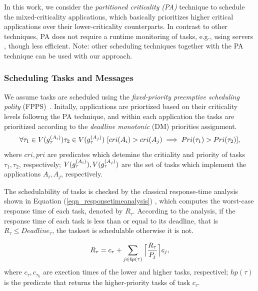 In this work, we consider the \textit{partitioned criticality (PA)}  technique to schedule the mixed-criticality applications, which basically prioritizes higher critical applications over their lower-criticality counterparts. In contrast to other techniques, PA does not require a runtime monitoring of tasks, e.g., using servers \cite{AbeniIntegratingSystems,Ashjaei2017DesigningSystems,Inam2014ThePlatforms}, though less efficient. Note: other scheduling techniques together with the PA technique can be used with our approach.

\subsubsection{Scheduling Tasks and Messages}\label{subsec_responsetimeanalysis}
We assume tasks are scheduled using the \textit{fixed-priority preemptive scheduling polity} (FPPS)~\cite{Sha-RTS-2004}. Initally, applications are priortized based on their criticality levels followng the PA technique, and within each application the tasks are prioritized according to the \textit{deadline monotonic} (DM) priorities assignment. 
\[
\forall \tau_1\in V(\sss{g}[i][\tau])\tau_2\in V(\sss{g}[j][\tau])\ [cri(A_i)>cri(A_j)\implies Pri(\tau_1)>Pri(\tau_2)],
\]
where $cri, pri$ are predicates which detemine the critiality and priority of tasks $\tau_1,\tau_2$, respectively; $V(\sss{g}[i][\tau]), V(\sss{g}[j][\tau])$ are the set of tasks which implement the applications $A_i,A_j$, respectively.

The schedulability of tasks is checked by the classical response-time analysis shown in Equation (\ref{eqn_responsetimeanalysis}) \cite{Baruah2011Response-timeSystems,Baruah2011Response-timeSystems}, which computes the worst-case response time of each task, denoted by $R_\tau$. According to the analysis, if the response time of each task is less than or equal to its deadline, that is $R_\tau\leq Deadline_\tau$, the taskset is schedulable otherwise it is not. 

\begin{align}
\label{eqn_responsetimeanalysis}
R_\tau=c_\tau+\sum_{j\in h\!p(\tau)}
{
	\ceil[\Big]
	{
		\frac{R_\tau}{P_j}
	}c_j
},
\end{align}
where $c_\tau,c_{\tau_h}$ are exection times of the lower and higher tasks, respectivel; $h\!p(\tau)$ is the predicate that returns the higher-priority tasks of task $c_\tau$.


